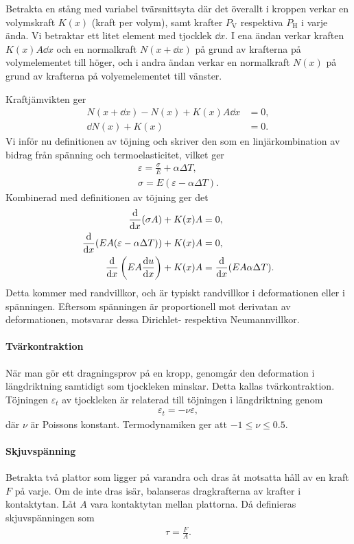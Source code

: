 Betrakta en stång med variabel tvärsnittsyta där det överallt i kroppen verkar en volymskraft $K(x)$ (kraft per volym), samt krafter $P_{\text{V}}$ respektiva $P_{\text{H}}$ i varje ända. Vi betraktar ett litet element med tjocklek $\dd{x}$. I ena ändan verkar kraften $K(x)A\dd{x}$ och en normalkraft $N(x + \dd{x})$ på grund av krafterna på volymelementet till höger, och i andra ändan verkar en normalkraft $N(x)$ på grund av krafterna på volyemelementet till vänster.

Kraftjämvikten ger
\begin{align*}
	N(x + \dd{x}) - N(x) + K(x)A\dd{x} &= 0, \\
	\dd{N}(x) + K(x)                   &= 0.
\end{align*}
Vi inför nu definitionen av töjning och skriver den som en linjärkombination av bidrag från spänning och termoelasticitet, vilket ger
\begin{align*}
	\varepsilon = \frac{\sigma}{E} + \alpha\Delta T, \\
	\sigma = E(\varepsilon - \alpha\Delta T).
\end{align*}
Kombinerad med definitionen av töjning ger det
\begin{align*}
	\dv{x} (\sigma A) + K(x)A &= 0, \\
	\dv{x} (EA(\varepsilon - \alpha\Delta T)) + K(x)A &= 0, \\
	\dv{x}\left(EA\dv{u}{x}\right) + K(x)A &= \dv{x}(EA\alpha\Delta T).
\end{align*}
Detta kommer med randvillkor, och är typiskt randvillkor i deformationen eller i spänningen. Eftersom spänningen är proportionell mot derivatan av deformationen, motsvarar dessa Dirichlet- respektiva Neumannvillkor.

\paragraph{Tvärkontraktion}
När man gör ett dragningsprov på en kropp, genomgår den deformation i längdriktning samtidigt som tjockleken minskar. Detta kallas tvärkontraktion. Töjningen $\varepsilon_{t}$ av tjockleken är relaterad till töjningen i längdriktning genom
\begin{align*}
	\varepsilon_{t} = -\nu\varepsilon,
\end{align*}
där $\nu$ är Poissons konstant. Termodynamiken ger att $-1\leq\nu\leq 0.5$.

\paragraph{Skjuvspänning}
Betrakta två plattor som ligger på varandra och dras åt motsatta håll av en kraft $F$ på varje. Om de inte dras isär, balanseras dragkrafterna av krafter i kontaktytan. Låt $A$ vara kontaktytan mellan plattorna. Då definieras skjuvspänningen som
\begin{align*}
	\tau = \frac{F}{A}.
\end{align*}

